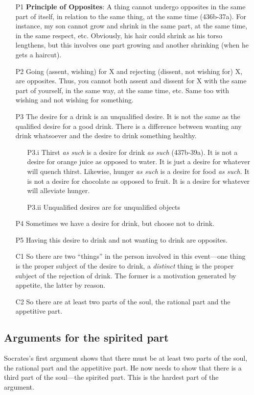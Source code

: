 \documentclass[oneside]{article}
\begin{document}
\begin{enumerate}
\item [P1] \textbf{Principle of Opposites}: A thing cannot undergo opposites in the same part of itself, in relation to the same thing, at the same time (436b-37a). For instance, my son cannot grow and shrink in the same part, at the same time, in the same respect, etc. Obviously, his hair could shrink as his torso lengthens, but this involves one part growing and another shrinking (when he gets a haircut).
\item[P2] Going (assent, wishing) for X and rejecting (dissent, not wishing for) X, are opposites. Thus, you cannot both assent and dissent for X with the same part of yourself, in the same way, at the same time, etc. Same too with wishing and not wishing for something. 
\item[P3] The desire for a drink is an unqualified desire. It is not the same as the qualified desire for a good drink. There is a difference between wanting any drink whatsoever and the desire to drink something healthy. 
\begin{enumerate}
\item[P3.i] Thirst \emph{as such} is a desire for drink \emph{as such} (437b-39a). It is not a desire for orange juice as opposed to water. It is just a desire for whatever will quench  thirst. Likewise, hunger \emph{as such} is a desire for food \emph{as such}. It is not a desire for chocolate as opposed to fruit. It is a desire for whatever will alleviate hunger. 
\item[P3.ii] Unqualified desires are for unqualified objects
\end{enumerate}
\item[P4] Sometimes we have a desire for drink, but choose not to drink.
\item[P5] Having this desire to drink and not wanting to drink are opposites.
\item[C1] So there are two ``things'' in the person involved in this event---one thing is the proper subject of the desire to drink, a \emph{distinct} thing is the proper subject of the rejection of drink. The former is a motivation generated by appetite, the latter by reason.
\item[C2] So there are at least two parts of the soul, the rational part and the appetitive part. 
\end{enumerate}

\subsection*{Arguments for the spirited part}
Socrates's first argument shows that there must be at least two parts of the soul, the rational part and the appetitive part. He now needs to show that there is a third part of the soul---the spirited part. This is the hardest part of the argument. 
\end{document}

